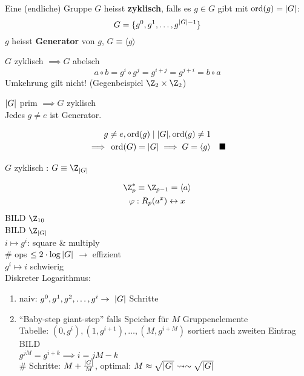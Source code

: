 \begin{def*}[note = zyklisch , index = zyklisch]
	Eine (endliche) Gruppe $G$ heisst \textbf{zyklisch}, falls es $g \in G$ gibt mit $\operatorname{ord}(g) = \abs{G}$:
	\[ G = \{ g^0 , g^1 , \dotsc , g^{\abs{G}-1} \} \]
	$g$ heisst \textbf{Generator} von $g$, $G \equiv \langle g \rangle$
\end{def*}
\begin{bem}
	$G$ zyklisch $\implies G$ abelsch \\
	\[ a \circ b = g^i \circ g^j = g^{i+j} = g^{j+i} = b \circ a \]
	Umkehrung gilt nicht! (Gegenbeispiel $\Z_2 \times \Z_2$)
\end{bem}
\begin{satz*}
	$\abs{G}$ prim $\implies G$ zyklisch \\
	Jedes $g \neq e$ ist Generator. \\
	\begin{bew}
		\begin{gather*}
			g \neq e , \ord(g) \mid \abs{G} , \ord(g) \neq 1 \\
			\implies \ord(G) = \abs{G} \implies G = \langle g \rangle \quad \blacksquare
		\end{gather*}
	\end{bew}
\end{satz*}
$G$ zyklisch : $G \equiv \Z_{\abs{G}}$ \\
\begin{bsp*}
	\begin{gather*}
		\Z_p^* \equiv \Z_{p-1} = \langle a \rangle \\
		\varphi : R_p(a^x) \leftrightarrow x
	\end{gather*}
	BILD $\Z_{10}$ \\
	BILD $\Z_{\abs{G}}$ \\
	$i \mapsto g^i$: square \& multiply \\
	\# ops $\leq 2 \cdot \log \abs{G}$
	$\rightarrow$ effizient \\
	$g^i \mapsto i$ schwierig \\
	Diskreter Logarithmus:
	\begin{enumerate}[label=\arabic*)]
		\item naiv: $g^0 , g^1 , g^2 , \dotsc , g^i \rightarrow \abs{G}$ Schritte
		\item \enquote{Baby-step giant-step} falls Speicher für $M$ Gruppenelemente \\
			Tabelle: $(0,g^i) , (1,g^{i+1}) , \dotsc , (M,g^{i+M})$ sortiert nach zweiten Eintrag \\
			BILD \\
			$g^{jM} = g^{i+k} \implies i = jM - k$ \\
			\# Schritte: $M + \frac{\abs{G}}{M}$, optimal: $M \approx \sqrt{\abs{G}} \rightsquigarrow \sim \sqrt{\abs{G}}$
	\end{enumerate}
\end{bsp*}
